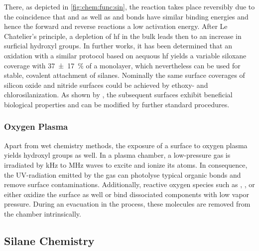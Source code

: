 There, as depicted in \ref{fig:chem:func:sin}, the reaction  takes place reversibly due to the coincidence that  and  as well as  and  bonds have similar binding energies and hence the forward and reverse reactions a low activation energy. After Le Chatelier's principle, a depletion of \gls{hf} in the bulk leads then to an increase in surficial hydroxyl groups. \cite{lit:chem:sin:SiFSiOH} In further works, it has been determined that an oxidation with a similar protocol based on aequous \gls{hf} yields a variable \gls{siloxane} coverage with \SI{37(17)}{\percent} of a monolayer, which nevertheless can be used for stable, covalent attachment of silanes.  Nominally the same surface coverages of silicon oxide and nitride surfaces could be achieved by ethoxy- and chlorosilanization. \cite{lit:chem:sin:surfacEtchingandMod} As shown by \citep{lit:chem:sin:silane}, the subsequent surfaces exhibit beneficial biological properties and can be modified by further standard procedures.


\subsubsection{Oxygen Plasma}
Apart from wet chemistry methods, the exposure of a surface to oxygen plasma yields \gls{hydroxyl} groups as well. In a plasma chamber, a low-pressure gas is irradiated by \si{\kilo\hertz} to \si{\mega\hertz} waves to excite and ionize its atoms. In consequence, the UV-radiation emitted by the gas can photolyse typical organic bonds and remove surface contaminations. Additionally, reactive oxygen species such as , ,  or  either oxidize the surface as well or bind dissociated components with low vapor pressure. During an evacuation in the process, these molecules are removed from the chamber intrinsically. \cite{lit:chem:plasma}  

\subsection{Silane Chemistry}

